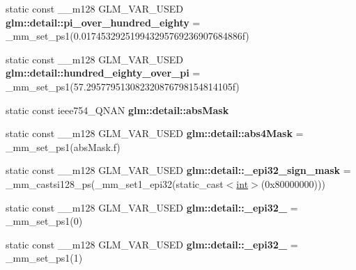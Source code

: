 \begin{DoxyCompactItemize}
\item 
\hypertarget{namespaceglm_1_1detail_a20b328728ad8d25e13f6b3810eadf1aa}{}static const \+\_\+\+\_\+m128 G\+L\+M\+\_\+\+V\+A\+R\+\_\+\+U\+S\+E\+D {\bfseries glm\+::detail\+::pi\+\_\+over\+\_\+hundred\+\_\+eighty} = \+\_\+mm\+\_\+set\+\_\+ps1(0.\+017453292519943295769236907684886f)\label{namespaceglm_1_1detail_a20b328728ad8d25e13f6b3810eadf1aa}

\item 
\hypertarget{namespaceglm_1_1detail_ac06fbd0cce2a89c8ce28d3c364f16985}{}static const \+\_\+\+\_\+m128 G\+L\+M\+\_\+\+V\+A\+R\+\_\+\+U\+S\+E\+D {\bfseries glm\+::detail\+::hundred\+\_\+eighty\+\_\+over\+\_\+pi} = \+\_\+mm\+\_\+set\+\_\+ps1(57.\+295779513082320876798154814105f)\label{namespaceglm_1_1detail_ac06fbd0cce2a89c8ce28d3c364f16985}

\item 
\hypertarget{namespaceglm_1_1detail_a69cfa5ece679b130bdcf67afebbe60a0}{}static const ieee754\+\_\+\+Q\+N\+A\+N {\bfseries glm\+::detail\+::abs\+Mask}\label{namespaceglm_1_1detail_a69cfa5ece679b130bdcf67afebbe60a0}

\item 
\hypertarget{namespaceglm_1_1detail_a65bb0c2fba6f18f94b7fa476b011e9e9}{}static const \+\_\+\+\_\+m128 G\+L\+M\+\_\+\+V\+A\+R\+\_\+\+U\+S\+E\+D {\bfseries glm\+::detail\+::abs4\+Mask} = \+\_\+mm\+\_\+set\+\_\+ps1(abs\+Mask.\+f)\label{namespaceglm_1_1detail_a65bb0c2fba6f18f94b7fa476b011e9e9}

\item 
\hypertarget{namespaceglm_1_1detail_a02efa29c91612f718f0d38000e42b7bf}{}static const \+\_\+\+\_\+m128 G\+L\+M\+\_\+\+V\+A\+R\+\_\+\+U\+S\+E\+D {\bfseries glm\+::detail\+::\+\_\+epi32\+\_\+sign\+\_\+mask} = \+\_\+mm\+\_\+castsi128\+\_\+ps(\+\_\+mm\+\_\+set1\+\_\+epi32(static\+\_\+cast$<$\hyperlink{_s_d_l__thread_8h_a6a64f9be4433e4de6e2f2f548cf3c08e}{int}$>$(0x80000000)))\label{namespaceglm_1_1detail_a02efa29c91612f718f0d38000e42b7bf}

\item 
\hypertarget{namespaceglm_1_1detail_afb50e1610ef210f0c073626e30781398}{}static const \+\_\+\+\_\+m128 G\+L\+M\+\_\+\+V\+A\+R\+\_\+\+U\+S\+E\+D {\bfseries glm\+::detail\+::\+\_\+epi32\+\_} = \+\_\+mm\+\_\+set\+\_\+ps1(0)\label{namespaceglm_1_1detail_afb50e1610ef210f0c073626e30781398}

\item 
\hypertarget{namespaceglm_1_1detail_a8907fdea808c7d22a43d67e80e02d09b}{}static const \+\_\+\+\_\+m128 G\+L\+M\+\_\+\+V\+A\+R\+\_\+\+U\+S\+E\+D {\bfseries glm\+::detail\+::\+\_\+epi32\+\_} = \+\_\+mm\+\_\+set\+\_\+ps1(1)\label{namespaceglm_1_1detail_a8907fdea808c7d22a43d67e80e02d09b}


\end{DoxyCompactItemize}
